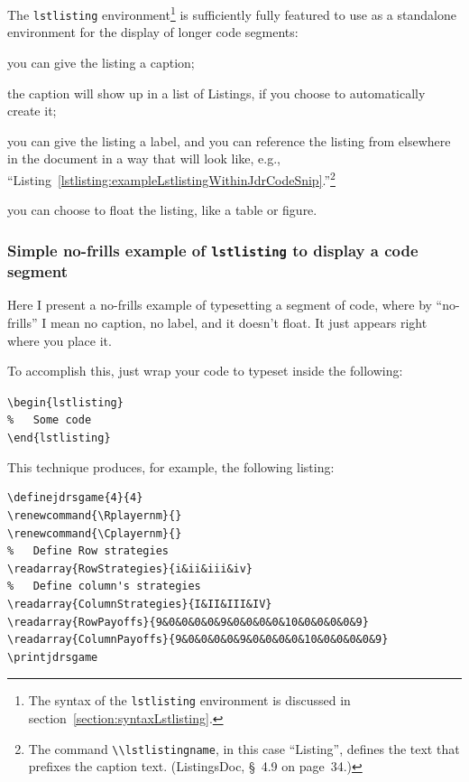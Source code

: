 \documentclass[12pt,table,final]{article}%
\begin{document}
The \lstinline|lstlisting| environment\footnote{The syntax of the \lstinline|lstlisting| environment is discussed in section~\ref{section:syntaxLstlisting}.} is sufficiently fully featured to use as a standalone environment for the display of longer code segments:
\begin{jdr_itemize}
  \item you can give the listing a caption;
  \item the caption will show up in a list of Listings, if you choose to automatically create it;
  \item you can give the listing a label, and you can reference the listing from elsewhere in the document in a way that will look like, e.g., ``Listing~\ref{lstlisting:exampleLstlistingWithinJdrCodeSnip}.''\footnote{The command \lstinline|\\lstlistingname|, in this case ``Listing'', defines the text that prefixes the caption text. (ListingsDoc, §~4.9 on page~34.)}
  \item you can choose to float the listing, like a table or figure.
\end{jdr_itemize}
\subsubsection{Simple no-frills example of \lstinline|lstlisting| to display a code segment}
Here I present a no-frills example of typesetting a segment of code, where by ``no-frills'' I mean no caption, no label, and it doesn't float. It just appears right where you place it.

To accomplish this, just wrap your code to typeset inside the following:
\begin{jdrCodeSnip}
\lstinline[mathescape]|\begin{lstlisting}|\\
\lstinline$%   Some code$\\
\lstinline$\end{lstlisting}$
\end{jdrCodeSnip}

This technique produces, for example, the following listing:
\begin{lstlisting}
\definejdrsgame{4}{4}
\renewcommand{\Rplayernm}{}
\renewcommand{\Cplayernm}{}
%   Define Row strategies
\readarray{RowStrategies}{i&ii&iii&iv}
%   Define column's strategies
\readarray{ColumnStrategies}{I&II&III&IV}
\readarray{RowPayoffs}{9&0&0&0&0&9&0&0&0&0&10&0&0&0&0&9}
\readarray{ColumnPayoffs}{9&0&0&0&0&9&0&0&0&0&10&0&0&0&0&9}
\printjdrsgame
\end{lstlisting}
\end{document}
